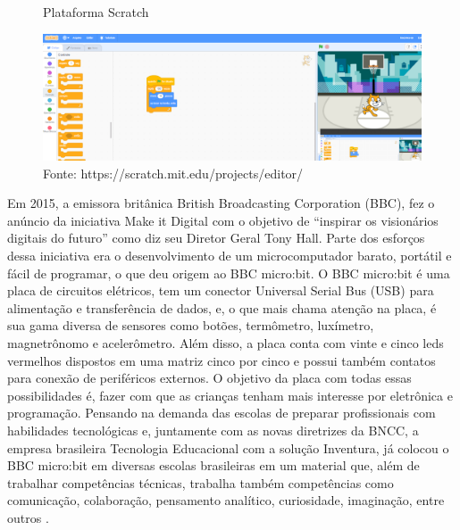 \begin{figure}[h!]
    \centering
    \caption{Plataforma Scratch}
    \includegraphics[width=15cm]{images/cap2/scratch.png}
    \caption*{Fonte: https://scratch.mit.edu/projects/editor/}
    \label{figura:scratch}
\end{figure}

Em 2015, a emissora britânica British Broadcasting Corporation (BBC), fez o anúncio da iniciativa Make it Digital com o objetivo de “inspirar os visionários digitais do futuro” como diz seu Diretor Geral Tony Hall. Parte dos esforços dessa iniciativa era o desenvolvimento de um microcomputador barato, portátil e fácil de programar, o que deu origem ao BBC micro:bit. O BBC micro:bit é uma placa de circuitos elétricos, tem um conector Universal Serial Bus (USB) para alimentação e transferência de dados, e, o que mais chama atenção na placa, é sua gama diversa de sensores como botões, termômetro, luxímetro, magnetrônomo e acelerômetro. Além disso, a placa conta com vinte e cinco leds vermelhos dispostos em uma matriz cinco por cinco e possui também contatos para conexão de periféricos externos. O objetivo da placa com todas essas possibilidades é, fazer com que as crianças tenham mais interesse por eletrônica e programação. Pensando na demanda das escolas de preparar profissionais com habilidades tecnológicas e, juntamente com as novas diretrizes da BNCC, a empresa brasileira Tecnologia Educacional com a solução Inventura, já colocou o BBC micro:bit em diversas escolas brasileiras em um material que, além de trabalhar competências técnicas, trabalha também competências como comunicação, colaboração, pensamento analítico, curiosidade, imaginação, entre outros \cite{about_microbit}. 

